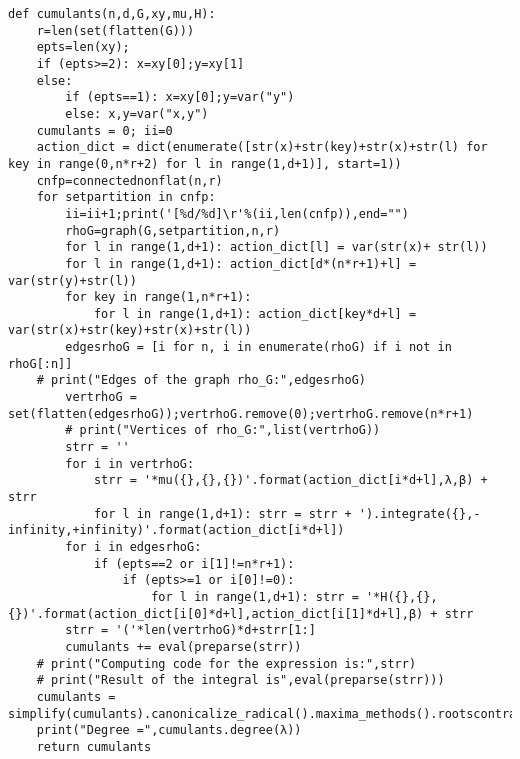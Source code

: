 \documentclass[12pt]{article}
\numberwithin{equation}{section}
\begin{document}
\begin{lstlisting}
def cumulants(n,d,G,xy,mu,H):
    r=len(set(flatten(G)))
    epts=len(xy);
    if (epts>=2): x=xy[0];y=xy[1]
    else:
        if (epts==1): x=xy[0];y=var("y")
        else: x,y=var("x,y")
    cumulants = 0; ii=0
    action_dict = dict(enumerate([str(x)+str(key)+str(x)+str(l) for key in range(0,n*r+2) for l in range(1,d+1)], start=1))
    cnfp=connectednonflat(n,r)
    for setpartition in cnfp: 
        ii=ii+1;print('[%d/%d]\r'%(ii,len(cnfp)),end="")
        rhoG=graph(G,setpartition,n,r)
        for l in range(1,d+1): action_dict[l] = var(str(x)+ str(l))
        for l in range(1,d+1): action_dict[d*(n*r+1)+l] = var(str(y)+str(l))
        for key in range(1,n*r+1): 
            for l in range(1,d+1): action_dict[key*d+l] = var(str(x)+str(key)+str(x)+str(l))
        edgesrhoG = [i for n, i in enumerate(rhoG) if i not in rhoG[:n]]
	# print("Edges of the graph rho_G:",edgesrhoG)
        vertrhoG = set(flatten(edgesrhoG));vertrhoG.remove(0);vertrhoG.remove(n*r+1)
        # print("Vertices of rho_G:",list(vertrhoG))
        strr = ''
        for i in vertrhoG:
            strr = '*mu({},{},{})'.format(action_dict[i*d+l],λ,β) + strr
            for l in range(1,d+1): strr = strr + ').integrate({},-infinity,+infinity)'.format(action_dict[i*d+l])
        for i in edgesrhoG:
            if (epts==2 or i[1]!=n*r+1): 
                if (epts>=1 or i[0]!=0):
                    for l in range(1,d+1): strr = '*H({},{},{})'.format(action_dict[i[0]*d+l],action_dict[i[1]*d+l],β) + strr
        strr = '('*len(vertrhoG)*d+strr[1:]
        cumulants += eval(preparse(strr))
    # print("Computing code for the expression is:",strr)
    # print("Result of the integral is",eval(preparse(strr)))
    cumulants = simplify(cumulants).canonicalize_radical().maxima_methods().rootscontract().simplify()
    print("Degree =",cumulants.degree(λ)) 
    return cumulants 
\end{lstlisting}

\footnotesize
\end{document}
